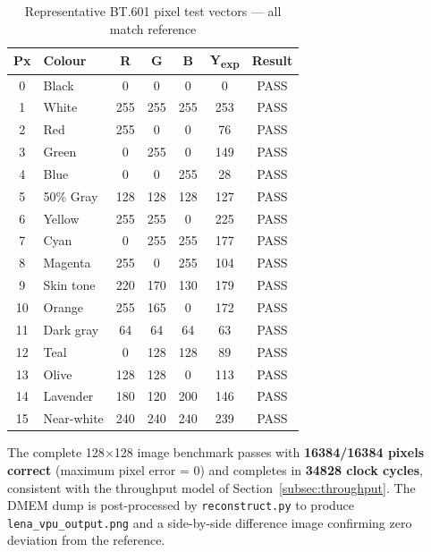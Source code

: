 \begin{table}[H]
  \centering
  \caption{Representative BT.601 pixel test vectors — all match reference}
  \label{tab:bt601_vectors}
  \begin{tabular}{clccccc}
    \toprule
    \textbf{Px} & \textbf{Colour} & \textbf{R} & \textbf{G} & \textbf{B} & \textbf{Y\textsubscript{exp}} & \textbf{Result} \\
    \midrule
     0 & Black       &   0 &   0 &   0 &   0 & PASS \\
     1 & White       & 255 & 255 & 255 & 253 & PASS \\
     2 & Red         & 255 &   0 &   0 &  76 & PASS \\
     3 & Green       &   0 & 255 &   0 & 149 & PASS \\
     4 & Blue        &   0 &   0 & 255 &  28 & PASS \\
     5 & 50\% Gray   & 128 & 128 & 128 & 127 & PASS \\
     6 & Yellow      & 255 & 255 &   0 & 225 & PASS \\
     7 & Cyan        &   0 & 255 & 255 & 177 & PASS \\
     8 & Magenta     & 255 &   0 & 255 & 104 & PASS \\
     9 & Skin tone   & 220 & 170 & 130 & 179 & PASS \\
    10 & Orange      & 255 & 165 &   0 & 172 & PASS \\
    11 & Dark gray   &  64 &  64 &  64 &  63 & PASS \\
    12 & Teal        &   0 & 128 & 128 &  89 & PASS \\
    13 & Olive       & 128 & 128 &   0 & 113 & PASS \\
    14 & Lavender    & 180 & 120 & 200 & 146 & PASS \\
    15 & Near-white  & 240 & 240 & 240 & 239 & PASS \\
    \bottomrule
  \end{tabular}
\end{table}

The complete 128$\times$128 image benchmark passes with \textbf{16384/16384 pixels
correct} (maximum pixel error = 0) and completes in \textbf{34828 clock cycles},
consistent with the throughput model of Section~\ref{subsec:throughput}. The DMEM
dump is post-processed by \texttt{reconstruct.py} to produce \texttt{lena\_vpu\_output.png}
and a side-by-side difference image confirming zero deviation from the reference.

